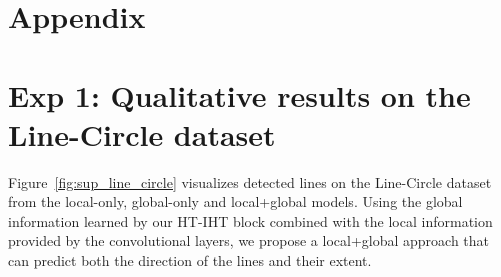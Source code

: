 \documentclass[runningheads]{llncs}
\newcommand{\model}{HT-IHT block\xspace}
\begin{document}
\newpage
\appendix
\section*{\Large\textbf{Appendix}}

\section{\textbf{Exp 1:} Qualitative results on the Line-Circle dataset}

Figure~\ref{fig:sup_line_circle} visualizes detected lines on the Line-Circle dataset from the local-only, global-only and local+global models. 
Using the global information learned by our \model combined with the local information provided by the convolutional layers, we propose a local+global approach that can predict both the direction of the lines and their extent.
\end{document}
